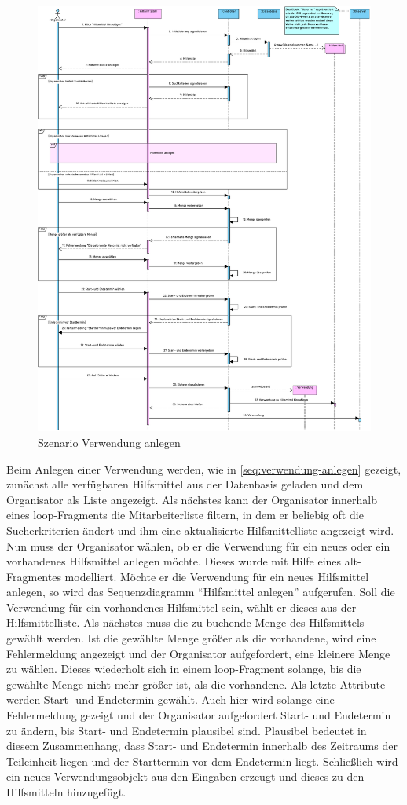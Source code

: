 \begin{figure}[ht!]
    \centering
    \includegraphics[width=0.9\columnwidth]{Bilder/seq_Verwendung_anlegen.pdf}
    \caption{Szenario Verwendung anlegen}
    \label{seq:verwendung-anlegen}
\end{figure}

Beim Anlegen einer Verwendung werden, wie in \autoref{seq:verwendung-anlegen} gezeigt, zunächst alle verfügbaren Hilfsmittel aus der Datenbasis geladen und dem Organisator als Liste angezeigt. Als nächstes kann der Organisator innerhalb eines loop-Fragments die Mitarbeiterliste filtern, in dem er beliebig oft die Sucherkriterien ändert und ihm eine aktualisierte Hilfsmittelliste angezeigt wird. Nun muss der Organisator wählen, ob er die Verwendung für ein neues oder ein vorhandenes Hilfsmittel anlegen möchte. Dieses wurde mit Hilfe eines alt-Fragmentes modelliert. Möchte er die Verwendung für ein neues Hilfsmittel anlegen, so wird das Sequenzdiagramm \enquote{Hilfsmittel anlegen} aufgerufen. Soll die Verwendung für ein vorhandenes Hilfsmittel sein, wählt er dieses aus der Hilfsmittelliste. Als nächstes muss die zu buchende Menge des Hilfsmittels gewählt werden. Ist die gewählte Menge größer als die vorhandene, wird eine Fehlermeldung angezeigt und der Organisator aufgefordert, eine kleinere Menge zu wählen. Dieses wiederholt sich in einem loop-Fragment solange, bis die gewählte Menge nicht mehr größer ist, als die vorhandene. Als letzte Attribute werden Start- und Endetermin gewählt. Auch hier wird solange eine Fehlermeldung gezeigt und der Organisator aufgefordert Start- und Endetermin zu ändern, bis Start- und Endetermin plausibel sind. Plausibel bedeutet in diesem Zusammenhang, dass Start- und Endetermin innerhalb des Zeitraums der Teileinheit liegen und der Starttermin vor dem Endetermin liegt. Schließlich wird ein neues Verwendungsobjekt aus den Eingaben erzeugt und dieses zu den Hilfsmitteln hinzugefügt.

